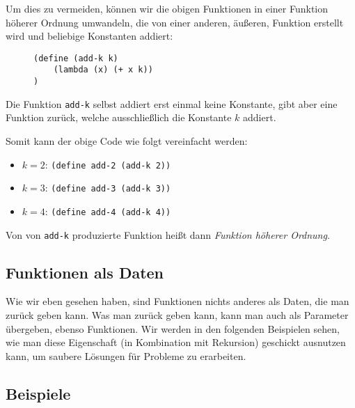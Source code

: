 	Um dies zu vermeiden, können wir die obigen Funktionen in einer Funktion höherer Ordnung umwandeln, die von einer anderen, äußeren, Funktion erstellt wird und beliebige Konstanten addiert:
	\begin{figure}[H]
		\centering
		\begin{lstlisting}[language = Racket]
(define (add-k k)
	(lambda (x) (+ x k))
)
		\end{lstlisting}
	\end{figure}
	Die Funktion \texttt{add-k} selbst addiert erst einmal keine Konstante, gibt aber eine Funktion zurück, welche ausschließlich die Konstante \(k\) addiert.
	
	Somit kann der obige Code wie folgt vereinfacht werden:
	\begin{itemize}
		\item \( k = 2 \): \lstinline[language = Racket]|(define add-2 (add-k 2))|
		\item \( k = 3 \): \lstinline[language = Racket]|(define add-3 (add-k 3))|
		\item \( k = 4 \): \lstinline[language = Racket]|(define add-4 (add-k 4))|
	\end{itemize}
	Von von \texttt{add-k} produzierte Funktion heißt dann \textit{Funktion höherer Ordnung}.
	

\subsection{Funktionen als Daten}
	Wie wir eben gesehen haben, sind Funktionen nichts anderes als Daten, die man zurück geben kann. Was man zurück geben kann, kann man auch als Parameter übergeben, ebenso Funktionen. Wir werden in den folgenden Beispielen sehen, wie man diese Eigenschaft (in Kombination mit Rekursion) geschickt ausnutzen kann, um saubere Lösungen für Probleme zu erarbeiten.

\subsection{Beispiele}
